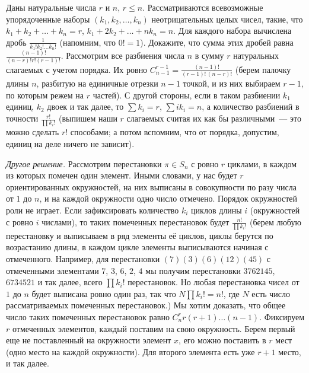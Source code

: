 \problem
Даны натуральные числа $r$ и $n$, $r \leq n$.
Рассматриваются всевозможные упорядоченные наборы $(k_1, k_2, \ldots, k_n)$
неотрицательных целых чисел, такие, что
$k_1 + k_2 + \ldots + k_n = r$, $k_1 + 2 k_2 + \ldots + n k_n = n$.
Для каждого набора вычислена дробь $\frac{1}{k_1! k_2! \ldots k_n!}$
(напомним, что $0! = 1$).
Докажите, что сумма этих дробей равна
\(
    \frac{(n - 1)!}{(n - r)! r! (r - 1)!}
\).
\solution
Рассмотрим все разбиения числа $n$ в сумму $r$ натуральных слагаемых с учетом
порядка.
Их ровно
$C_{n - 1}^{r - 1} = \frac{(n - 1)!}{(r - 1)! \, (n - r)!}$
(берем палочку длины $n$, разбитую на единичные отрезки $n - 1$ точкой, и из
них выбираем $r - 1$, по которым режем на $r$ частей).
С другой стороны, если в таком разбиении $k_1$ единиц, $k_2$ двоек и так далее,
то $\sum k_i = r$, $\sum i k_i = n$, а количество разбиений в точности
$\frac{r!}{\prod k_i!}$
(выпишем наши $r$ слагаемых считая их как бы различными~--- это можно сделать
$r!$ способами; а потом вспомним, что от порядка, допустим, единиц на деле
ничего не зависит).
\par
\emph{Другое решение.}
Рассмотрим перестановки $\pi \in S_n$ с ровно $r$ циклами, в каждом из которых
помечен один элемент.
Иными словами, у нас будет $r$ ориентированных окружностей, на них выписаны в
совокупности по разу числа от $1$ до $n$, и на каждой окружности одно число
отмечено.
Порядок окружностей роли не играет.
Если зафиксировать количество $k_i$ циклов длины $i$
(окружностей с ровно $i$ числами), то таких помеченных перестановок будет
$\frac{n!}{\prod k_i!}$
(берем любую перестановку и выписываем в ряд элементы её циклов, циклы берутся
по возрастанию длины, в каждом цикле элементы выписываются начиная с
отмеченного.
Например, для перестановки $(7) (3) (6) (1 2) (4 5)$ с отмеченными элементами
$7$, $3$, $6$, $2$, $4$ мы получим перестановки $3762145$, $6734521$ и так
далее, всего $\prod k_i!$ перестановок.
Но любая перестановка чисел от $1$ до $n$ будет выписана ровно один раз, так
что $N \prod k_i! = n!$, где $N$ есть число рассматриваемых помеченных
перестановок.)
Мы хотим доказать, что общее число таких помеченных перестановок равно
$C_n^{r} r (r + 1) \ldots (n - 1)$.
Фиксируем $r$ отмеченных элементов, каждый поставим на свою окружность.
Берем первый еще не поставленный на окружности элемент $x$, его можно поставить
в $r$ мест (одно место на каждой окружности).
Для второго элемента есть уже $r + 1$ место, и так далее.
\endproblem
